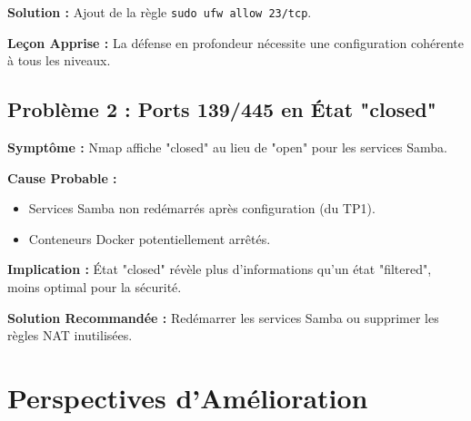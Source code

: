 \documentclass[12pt,a4paper,openany]{report}
\begin{document}
	\textbf{Solution :} Ajout de la règle \texttt{sudo ufw allow 23/tcp}.
	
	\textbf{Leçon Apprise :} La défense en profondeur nécessite une configuration cohérente à tous les niveaux.
	
	\subsection{Problème 2 : Ports 139/445 en État "closed"}
	\textbf{Symptôme :} Nmap affiche "closed" au lieu de "open" pour les services Samba.
	
	\textbf{Cause Probable :}
	\begin{itemize}
		\item Services Samba non redémarrés après configuration (du TP1).
		\item Conteneurs Docker potentiellement arrêtés.
	\end{itemize}
	
	\textbf{Implication :} État "closed" révèle plus d'informations qu'un état "filtered", moins optimal pour la sécurité.
	
	\textbf{Solution Recommandée :} Redémarrer les services Samba ou supprimer les règles NAT inutilisées.
	
	\section{Perspectives d'Amélioration}
	
\end{document}
